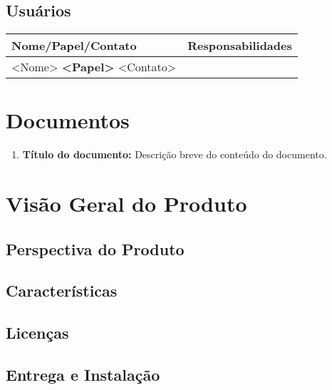 \documentclass{article}
\begin{document}
\subsection{Usuários}    

  \FloatBarrier
  \begin{table}[H]
    \begin{center}
      \begin{tabular}[pos]{|m{6cm} | m{9cm}|} 
        \hline
        \cellcolor[gray]{0.9}\textbf{Nome/Papel/Contato} &\cellcolor[gray]{0.9}\textbf{Responsabilidades}\\ \hline
        <Nome> \newline 
        \textbf{<Papel>} \newline 
        <Contato> & \\ \hline       
      \end{tabular}
    \end{center}
  \end{table}

\section{Documentos}
  
  \begin{enumerate}
  \item \textbf{Título do documento:} Descrição breve do conteúdo do documento.
  \end{enumerate}

\section{Visão Geral do Produto}
\subsection{Perspectiva do Produto}

\subsection{Características}

\subsection{Licenças}

\subsection{Entrega e Instalação}
\end{document}
